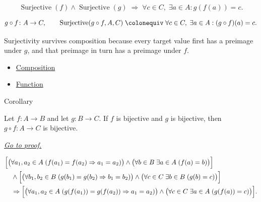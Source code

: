 \begin{remark*}
\[
  \operatorname{Surjective}(f)\wedge\operatorname{Surjective}(g)
  \;\Rightarrow\;
  \forall c\in C,\;\exists a\in A: g(f(a))=c.
\]
\end{remark*}

\begin{remark*}
\[
  g\circ f\colon A\to C,\qquad
  \operatorname{Surjective}(g\circ f, A, C)
  \;\colonequiv\;
  \forall c\in C,\;\exists a\in A: (g\circ f)(a)=c.
\]
\end{remark*}

\begin{remark*}[Interpretation]
Surjectivity survives composition because every target value first has a
preimage under $g$, and that preimage in turn has a preimage under $f$.
\end{remark*}

\begin{dependencies}
\begin{itemize}
  \item \hyperref[def:composition]{Composition}
  \item \hyperref[def:function]{Function}
\end{itemize}
\end{dependencies}

\begin{corollarybox}{Corollary}
\begin{corollary}
\label{cor:composition-bijective}
Let $f:A\to B$ and let $g:B\to C$. If $f$ is bijective and $g$ is
bijective, then $g\circ f:A\to C$ is bijective.

\smallskip\noindent
\hyperref[prf:composition-bijective]{\textit{Go to proof.}}
\end{corollary}
\end{corollarybox}

\begin{remark*}
\[
\begin{aligned}
&\Bigl[
  \bigl(\forall a_1,a_2\in A\;(f(a_1)=f(a_2)\Rightarrow a_1=a_2)\bigr)
  \wedge
  \bigl(\forall b\in B\;\exists a\in A\;(f(a)=b)\bigr)
 \Bigr] \\
&\quad\wedge
 \Bigl[
  \bigl(\forall b_1,b_2\in B\;(g(b_1)=g(b_2)\Rightarrow b_1=b_2)\bigr)
  \wedge
  \bigl(\forall c\in C\;\exists b\in B\;(g(b)=c)\bigr)
 \Bigr] \\
&\quad\Rightarrow
 \Bigl[
  \bigl(\forall a_1,a_2\in A\;(g(f(a_1))=g(f(a_2))\Rightarrow a_1=a_2)\bigr)
  \wedge
  \bigl(\forall c\in C\;\exists a\in A\;(g(f(a))=c)\bigr)
 \Bigr].
\end{aligned}
\]
\end{remark*}


